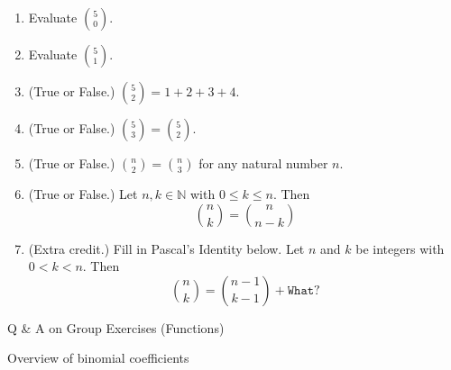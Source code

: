 \documentclass[10pt]{beamer}
\begin{document}
\begin{frame}

\begin{mygreenbox}[title= Reading Quiz (Binomial Coefficients)]
\footnotesize 
\begin{enumerate}
	\item Evaluate $\binom{5}{0}$.
	\item Evaluate $\binom{5}{1}$.
	\item (True or False.) $\binom{5}{2} = 1 + 2+ 3+ 4$.
	\item (True or False.) $\binom{5}{3} = \binom{5}{2}$.
	\item (True or False.)  $\binom{n}{2} = \binom{n}{3}$ for any natural number $n$.

	\item (True or False.) Let $n,k \in \mathbb{N}$ with $0 \leq k \leq n$. Then 
	\[ \binom{n}{k} = \binom{n}{n-k} \]
	\item (Extra credit.) Fill in Pascal's Identity below.  Let $n$ and $k$ be integers with $0 < k <n$.  Then 
	\[ \binom{n}{k} = \binom{n-1}{k-1} + \texttt{What?} \]
	\end{enumerate}
\end{mygreenbox}
	
\end{frame}


\begin{frame}[standout]
Q  \& A on Group Exercises  (Functions)
\end{frame}


\begin{frame}[standout]
Overview of binomial coefficients
\end{frame}
\end{document}
